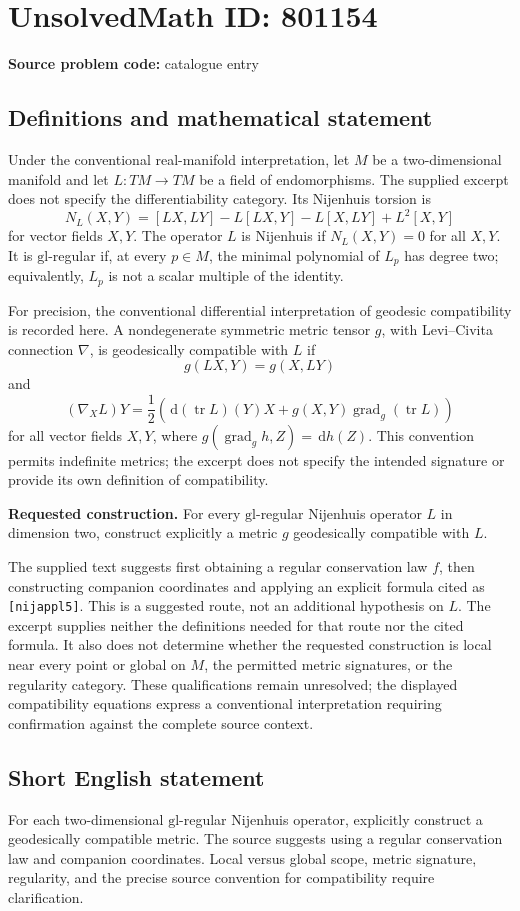 \documentclass[11pt]{article}
\newcommand{\dd}{\,\mathrm{d}}
\begin{document}
\section*{UnsolvedMath ID: 801154}
\textbf{Source problem code:} catalogue entry
\subsection{Definitions and mathematical statement}
Under the conventional real-manifold interpretation, let \(M\) be a two-dimensional manifold and let \(L\colon TM\to TM\) be a field of endomorphisms. The supplied excerpt does not specify the differentiability category. Its Nijenhuis torsion is
\[
N_L(X,Y)=[LX,LY]-L[LX,Y]-L[X,LY]+L^2[X,Y]
\]
for vector fields \(X,Y\). The operator \(L\) is Nijenhuis if \(N_L(X,Y)=0\) for all \(X,Y\). It is \(\mathrm{gl}\)-regular if, at every \(p\in M\), the minimal polynomial of \(L_p\) has degree two; equivalently, \(L_p\) is not a scalar multiple of the identity.

For precision, the conventional differential interpretation of geodesic compatibility is recorded here. A nondegenerate symmetric metric tensor \(g\), with Levi--Civita connection \(\nabla\), is geodesically compatible with \(L\) if
\[
g(LX,Y)=g(X,LY)
\]
and
\[
(\nabla_XL)Y=\frac12\left(\dd(\operatorname{tr}L)(Y)X+g(X,Y)\operatorname{grad}_g(\operatorname{tr}L)\right)
\]
for all vector fields \(X,Y\), where \(g(\operatorname{grad}_g h,Z)=\dd h(Z)\). This convention permits indefinite metrics; the excerpt does not specify the intended signature or provide its own definition of compatibility.

\textbf{Requested construction.} For every \(\mathrm{gl}\)-regular Nijenhuis operator \(L\) in dimension two, construct explicitly a metric \(g\) geodesically compatible with \(L\).

The supplied text suggests first obtaining a regular conservation law \(f\), then constructing companion coordinates and applying an explicit formula cited as \texttt{[nijappl5]}. This is a suggested route, not an additional hypothesis on \(L\). The excerpt supplies neither the definitions needed for that route nor the cited formula. It also does not determine whether the requested construction is local near every point or global on \(M\), the permitted metric signatures, or the regularity category. These qualifications remain unresolved; the displayed compatibility equations express a conventional interpretation requiring confirmation against the complete source context.
\subsection{Short English statement}
For each two-dimensional \(\mathrm{gl}\)-regular Nijenhuis operator, explicitly construct a geodesically compatible metric. The source suggests using a regular conservation law and companion coordinates. Local versus global scope, metric signature, regularity, and the precise source convention for compatibility require clarification.
\end{document}

